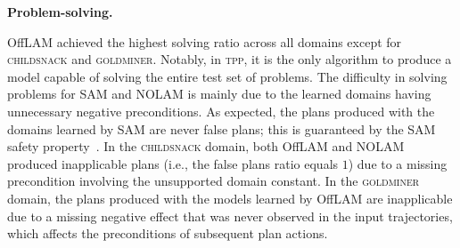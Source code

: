 \documentclass[letterpaper]{article} %
\newcommand{\nolam}{NOLAM\xspace}
\newcommand{\offlam}{OffLAM\xspace}
\newcommand{\samshort}{SAM\xspace}
\newcommand{\miniparagraph}[1]{\textbf{#1.}}
\newif\ifaddcomments
\newcommand{\roni}[1]{\ifaddcomments{\textcolor{red}{[Roni: #1]}}\fi}
\newcommand{\leo}[1]{\ifaddcomments{\textcolor{pink}{[Leonardo: #1]}}\fi}
\begin{document}



\miniparagraph{Problem-solving}  
%

%
\offlam{} achieved the highest solving ratio across all domains except for \textsc{childsnack} and \textsc{goldminer}. Notably, in \textsc{tpp}, it is the only algorithm to produce a model capable of solving the entire test set of problems.
The difficulty in solving problems for \samshort{} and \nolam{} is mainly due to the learned domains having unnecessary negative preconditions. 
%
As expected, the plans produced with the domains learned by \samshort are never false plans; this is guaranteed by the \samshort safety property~\cite{juba2021safe}. 
In the \textsc{childsnack} domain, both \offlam and \nolam produced inapplicable plans (i.e., the false plans ratio equals $1$) due to a missing precondition involving the unsupported domain constant.
In the \textsc{goldminer} domain, the plans produced with the models learned by \offlam{} are inapplicable due to a missing negative effect that was never observed in the input trajectories, which affects the preconditions of subsequent plan actions.
\end{document}
